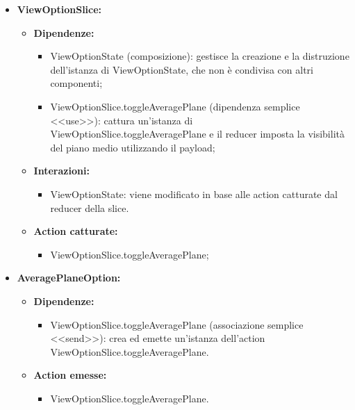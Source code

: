 \begin{itemize}
    \item \textbf{ViewOptionSlice:}
          \begin{itemize}
              \item \textbf{Dipendenze:}
                    \begin{itemize}
                        \item ViewOptionState (composizione): gestisce la creazione e la distruzione
                              dell'istanza di ViewOptionState, che non è condivisa con altri componenti;
                        \item ViewOptionSlice.toggleAveragePlane (dipendenza semplice <<use>>): cattura
                              un'istanza di ViewOptionSlice.toggleAveragePlane e il reducer imposta la
                              visibilità del piano medio utilizzando il payload;
                    \end{itemize}
              \item \textbf{Interazioni:}
                    \begin{itemize}
                        \item ViewOptionState: viene modificato in base alle action catturate dal reducer
                              della slice.
                    \end{itemize}
              \item \textbf{Action catturate:}
                    \begin{itemize}
                        \item ViewOptionSlice.toggleAveragePlane;
                    \end{itemize}
          \end{itemize}

    \item \textbf{AveragePlaneOption:}
          \begin{itemize}
              \item \textbf{Dipendenze:}
                    \begin{itemize}
                        \item ViewOptionSlice.toggleAveragePlane (associazione semplice <<send>>): crea ed
                              emette un'istanza dell'action ViewOptionSlice.toggleAveragePlane.
                    \end{itemize}
              \item \textbf{Action emesse:}
                    \begin{itemize}
                        \item ViewOptionSlice.toggleAveragePlane.
                    \end{itemize}
          \end{itemize}


\end{itemize}
